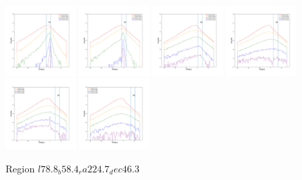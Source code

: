 \documentclass[12pt,prd]{article}
\begin{document}
\begin{figure}[h!]
\includegraphics[width=0.24\textwidth]{../figures/scanning_plotsgaiascan_l78_8_b58_4_ra224_7_dec46_3_npy_12.pdf}
\includegraphics[width=0.24\textwidth]{../figures/scanning_plotsgaiascan_l78_8_b58_4_ra224_7_dec46_3_npy_13.pdf}
\includegraphics[width=0.24\textwidth]{../figures/scanning_plotsgaiascan_l78_8_b58_4_ra224_7_dec46_3_npy_14.pdf}
\includegraphics[width=0.24\textwidth]{../figures/scanning_plotsgaiascan_l78_8_b58_4_ra224_7_dec46_3_npy_15.pdf}
\includegraphics[width=0.24\textwidth]{../figures/scanning_plotsgaiascan_l78_8_b58_4_ra224_7_dec46_3_npy_16.pdf}
\includegraphics[width=0.24\textwidth]{../figures/scanning_plotsgaiascan_l78_8_b58_4_ra224_7_dec46_3_npy_17.pdf}
\caption{Region $l78.8_b58.4_ra224.7_dec46.3$}
\end{figure}
\end{document}
